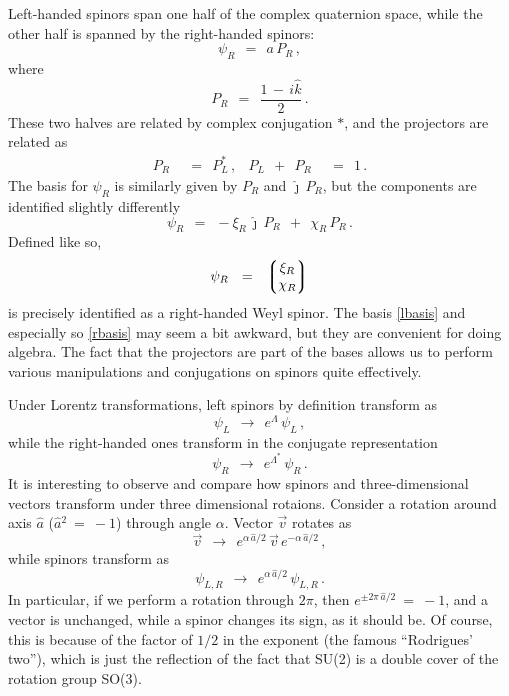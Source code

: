 \documentclass[epsfig,12pt]{article}
\newcommand{\jj}{\hat\jmath}
\newcommand{\kk}{\hat k}
\begin{document}
	Left-handed spinors span one half of the complex quaternion space, while the other half
	is spanned by the right-handed spinors:
\begin{equation}
	\psi_R	~~=~~	a\,P_R\,,
\end{equation}
	where
\begin{equation}
	P_R	~~=~~	\frac{1 \,-\, i\kk} 2\,.
\end{equation}
	These two halves are related by complex conjugation $ * $,
	and the projectors are related as
\begin{align}
	P_R	& ~~=~~	P_L^*\,,
	&
	P_L  ~~+~~  P_R	& ~~=~~ 1\,.
\end{align}
	The basis for $ \psi_R $ is similarly given by $ P_R $ and $ \jj\,P_R $, but the
	components are identified slightly differently
\begin{equation}
\label{rbasis}
	\psi_R	~~=~~	-\xi_R\,\jj\,P_R  ~~+~~  \chi_R\,P_R\,.
\end{equation}
	Defined like so,
\begin{equation}
	\psi_R	~~=~~	\left\lgroup
				\begin{matrix}
					\xi_R \\
					\chi_R
                		\end{matrix}
			\right\rgroup
\end{equation}
	is precisely identified as a right-handed Weyl spinor.
	The basis \eqref{lbasis} and especially so \eqref{rbasis} may seem a bit awkward,
	but they are convenient for doing algebra.
	The fact that the projectors are part of the bases allows us to perform
	various manipulations and conjugations on spinors quite effectively.

	Under Lorentz transformations, left spinors by definition transform as
\begin{equation}
	\psi_L	~~\to~~		e^\Lambda\, \psi_L\,,
\end{equation}
	while the right-handed ones transform in the conjugate representation
\begin{equation}
	\psi_R	~~\to~~		e^{\Lambda^*}\, \psi_R\,.
\end{equation}
	It is interesting to observe and compare how spinors and three-dimensional vectors
	transform under three dimensional rotaions.
	Consider a rotation around axis $ \hat a $ ($ \hat a{}^2 ~=~ -1 $) through angle $ \alpha $.
	Vector $ \vec v $ rotates as
\begin{equation}
	\vec v	~~\to~~		e^{\alpha\, \hat a/2}\, \vec v\, e^{-\alpha\, \hat a/2}\,,
\end{equation}
	while spinors transform as
\begin{equation}
	\psi_{L,R}	~~\to~~	e^{\alpha\, \hat a/2}\, \psi_{L,R}\,.
\end{equation}
	In particular, if we perform a rotation through $ 2\pi $, then
	$ e^{\pm 2\pi\,\hat a/2} ~=~ -1 $, and a vector is unchanged,
	while a spinor changes its sign, as it should be.
	Of course, this is because of the factor of $ 1/2 $ in the exponent (the famous ``Rodrigues' two''), which
	is just the reflection of the fact that SU(2) is a double cover of
	the rotation group SO(3).
\end{document}
